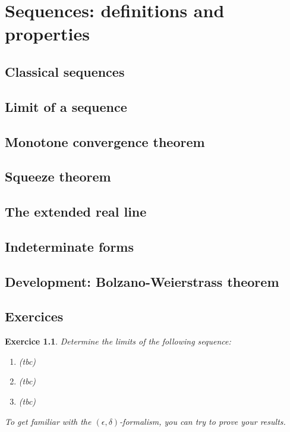 \documentclass[
	fontsize=10pt, %
	twoside=true, %
	secnumdepth=1, %
	numbers=noenddot, %
]{kaobook}
\newtheorem{exer}{Exercice}[chapter]
\begin{document}
\chapter{Sequences: definitions and properties}

\section{Classical sequences}

\section{Limit of a sequence}

\section{Monotone convergence theorem}

\section{Squeeze theorem}

\section{The extended real line}

\section{Indeterminate forms}

\section{Development: Bolzano-Weierstrass theorem}

\section{Exercices}
\begin{exer}
Determine the limits of the following sequence:
\begin{enumerate}
	\item (tbc)
	\item (tbc)
	\item (tbc)
\end{enumerate}

To get familiar with the $(\epsilon,\delta)$-formalism, you can try to prove your results.
\end{exer}
\end{document}
